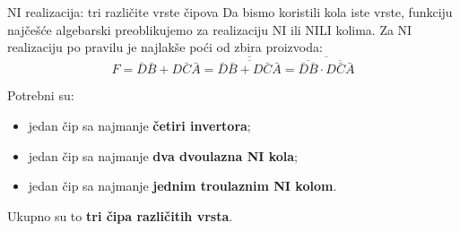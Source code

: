 \begin{frame}[label=02-s048]{NI realizacija: tri različite vrste čipova}
\setlength{\parskip}{0pt}
Da bismo koristili kola iste vrste, funkciju najčešće algebarski preoblikujemo za realizaciju NI ili NILI kolima. Za NI realizaciju po pravilu je najlakše poći od zbira proizvoda:
\[F=\bar D\bar B+D\bar C\bar A
=\overline{\overline{\bar D\bar B+D\bar C\bar A}}
=\overline{\overline{\bar D\bar B}\cdot\overline{D\bar C\bar A}}\]
\par\vspace{2mm}
Potrebni su:
\begin{itemize}
\item jedan čip sa najmanje \textbf{četiri invertora};
\item jedan čip sa najmanje \textbf{dva dvoulazna NI kola};
\item jedan čip sa najmanje \textbf{jednim troulaznim NI kolom}.
\end{itemize}
Ukupno su to \textbf{tri čipa različitih vrsta}.
\par\vspace{3mm}
\end{frame}
